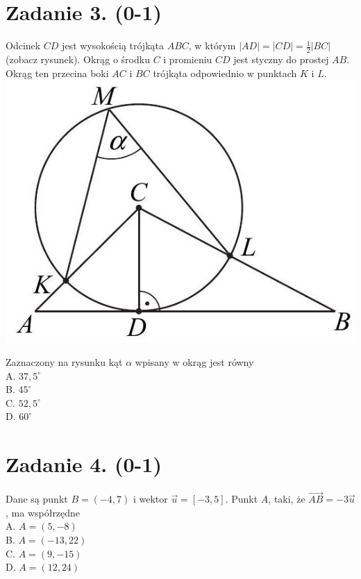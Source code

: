 \documentclass[10pt]{article}
\begin{document}
\section*{Zadanie 3. (0-1)}
Odcinek \(C D\) jest wysokością trójkąta \(A B C\), w którym \(|A D|=|C D|=\frac{1}{2}|B C|\) (zobacz rysunek). Okrąg o środku \(C\) i promieniu \(C D\) jest styczny do prostej \(A B\). Okrąg ten przecina boki \(A C\) i \(B C\) trójkąta odpowiednio w punktach \(K\) i \(L\).\\
\includegraphics[max width=\textwidth, center]{2024_11_21_3120cbc7edd07b3a101fg-02}

Zaznaczony na rysunku kąt \(\alpha\) wpisany w okrąg jest równy\\
A. \(37,5^{\circ}\)\\
B. \(45^{\circ}\)\\
C. \(52,5^{\circ}\)\\
D. \(60^{\circ}\)

\section*{Zadanie 4. (0-1)}
Dane są punkt \(B=(-4,7)\) i wektor \(\vec{u}=[-3,5]\). Punkt \(A\), taki, że \(\overrightarrow{A B}=-3 \vec{u}\), ma współrzędne\\
A. \(A=(5,-8)\)\\
B. \(A=(-13,22)\)\\
C. \(A=(9,-15)\)\\
D. \(A=(12,24)\)
\end{document}
